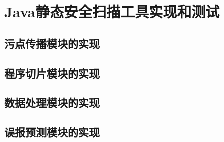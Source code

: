 \chapter{Java静态安全扫描工具实现和测试}
\section{污点传播模块的实现}

\section{程序切片模块的实现}

\section{数据处理模块的实现}

\section{误报预测模块的实现}
